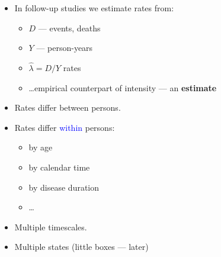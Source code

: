 

\begin{frame}[fragile]%
  \begin{itemize}[<+->]
  \item In follow-up studies we estimate rates from:

    \begin{itemize}[<+->]
    \item $D$ --- events, deaths
    \item $Y$ --- person-years
    \item $\hat\lambda = D/Y$ rates
    \item \ldots empirical counterpart of intensity --- an \textbf{estimate}
    \end{itemize}

  \item Rates differ between persons.
  \item Rates differ \textcolor{blue}{within} persons:

    \begin{itemize}[<+->]
    \item by age
    \item by calendar time
    \item by disease duration
    \item \ldots
    \end{itemize}

  \item Multiple timescales.
  \item Multiple states (little boxes --- later)
  \end{itemize}

\end{frame}




